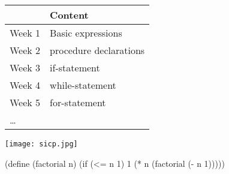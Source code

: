 \begin{frame}
\centering
\begin{tabular}{|l|l|}
\hline
       & Content \\
\hline\hline
Week 1 & Basic expressions  \\
\hline
Week 2 & procedure declarations \\
\hline
Week 3 & if-statement \\
\hline
Week 4 & while-statement \\
\hline
Week 5 & for-statement \\
\hline
\ldots & \\
\end{tabular}
\end{frame}


\begin{frame}
\centering
\texttt{[image: sicp.jpg]}
\end{frame}


\begin{frame}[fragile]
\begin{schemecode}
(define (factorial n)
  (if (<= n 1)
      1
      (* n (factorial (- n 1)))))
\end{schemecode}
\end{frame}


\iffalse
\begin{frame}[fragile]
\begin{schemecode}
(define (map proc items)
  (if (null? items)
      nil
      (cons (proc (car items))
            (map proc (cdr items)))))
\end{schemecode}
\end{frame}


\begin{frame}[fragile]
\begin{schemecode}
(define (abs x)
  (cond ((> x 0) x)
        ((= x 0) x)
        ((< x 0) (- x))))
\end{schemecode}
\end{frame}
\fi


